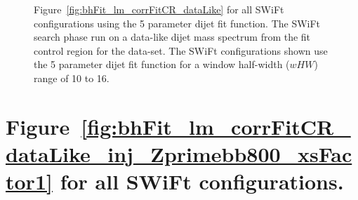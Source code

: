 \begin{figure}
{}
\vspace{10pt}
\caption[Figure~\ref{fig:bhFit_lm_corrFitCR_dataLike} for all SWiFt configurations using the 5 parameter dijet fit function.]
{\label{fig:app-bhFit_lm_corrFitCR_dataLike_5para}
  Figure~\ref{fig:bhFit_lm_corrFitCR_dataLike} for all SWiFt configurations using the 5 parameter dijet fit function.
  The SWiFt search phase run on a data-like dijet mass spectrum
  from the fit control region for the \lm{} data-set.
  The SWiFt configurations shown use the 5 parameter dijet fit function for a window half-width ($wHW$) range of 10 to 16.
}
\end{figure}

\clearpage
\vspace{2em}
\section{Figure~\ref{fig:bhFit_lm_corrFitCR_dataLike_inj_Zprimebb800_xsFactor1} for all SWiFt configurations.}
\vspace{3em}

